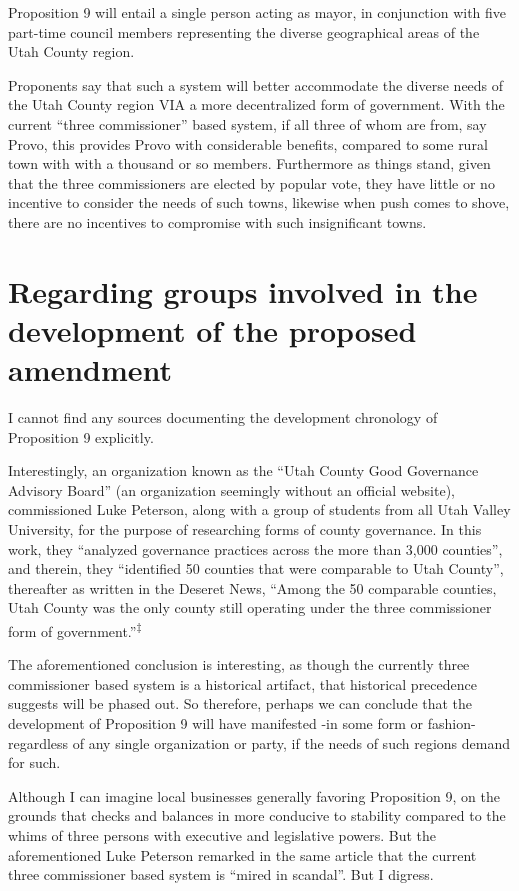 Proposition 9 will entail a single person acting as mayor, in conjunction with five part-time council members representing the diverse geographical areas of the Utah County region. 

Proponents say that such a system will better accommodate the diverse needs of the Utah County region VIA a more decentralized form of government. With the current “three commissioner” based system, if all three of whom are from, say Provo, this provides Provo with considerable benefits, compared to some rural town with with a thousand or so members. Furthermore as things stand, given that the three commissioners are elected by popular vote, they have little or no incentive to consider the needs of such towns, likewise when push comes to shove, there are no incentives to compromise with such insignificant towns. 


\section{Regarding groups involved in the development of the proposed amendment}

I cannot find any sources documenting the development chronology of Proposition 9 explicitly.


Interestingly, an organization known as the ``Utah County Good Governance Advisory Board'' (an organization seemingly without an official website), commissioned Luke Peterson, along with a group of students from all Utah Valley University, for the purpose of researching forms of county governance. In this work, they ``analyzed governance practices across the more than 3,000 counties'', and therein, they ``identified 50 counties that were comparable to Utah County'', thereafter as written in the Deseret News, ``Among the 50 comparable counties, Utah County was the only county still operating under the three commissioner form of government.''\textsuperscript{‡}

The aforementioned conclusion is interesting, as though the currently three commissioner based system is a historical artifact, that historical precedence suggests will be phased out. So therefore, perhaps we can conclude that the development of Proposition 9 will have manifested -in some form or fashion- regardless of any single organization or party, if the needs of such regions demand for such.

Although I can imagine local businesses generally favoring Proposition 9, on the grounds that checks and balances in more conducive to stability compared to the whims of three persons with executive and legislative powers. But the aforementioned Luke Peterson remarked in the same article that the current three commissioner based system is ``mired in scandal''. But I digress.


